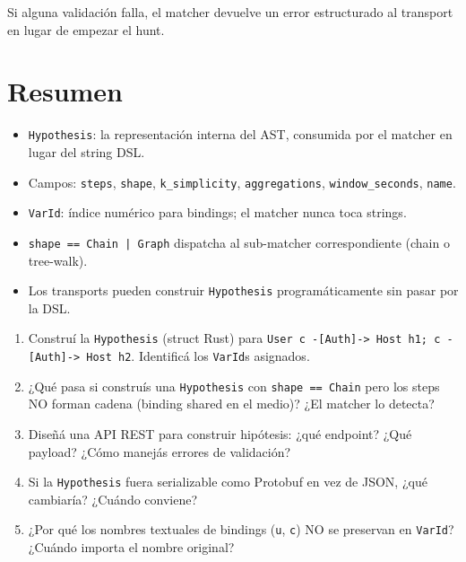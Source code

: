 \noindent
Si alguna validación falla, el matcher devuelve un error
estructurado al transport en lugar de empezar el hunt.

\section{Resumen}

\begin{itemize}
    \item \texttt{Hypothesis}: la representación interna del AST,
    consumida por el matcher en lugar del string DSL.
    \item Campos: \texttt{steps}, \texttt{shape}, \texttt{k\_simplicity},
    \texttt{aggregations}, \texttt{window\_seconds}, \texttt{name}.
    \item \texttt{VarId}: índice numérico para bindings; el matcher
    nunca toca strings.
    \item \texttt{shape == Chain | Graph} dispatcha al
    sub-matcher correspondiente (chain o tree-walk).
    \item Los transports pueden construir \texttt{Hypothesis}
    programáticamente sin pasar por la DSL.
\end{itemize}

\begin{ejercicios}
\begin{enumerate}
    \item \starred{} Construí la \texttt{Hypothesis} (struct Rust)
    para
    \texttt{User c -[Auth]-> Host h1; c -[Auth]-> Host h2}.
    Identificá los \texttt{VarId}s asignados.

    \item ¿Qué pasa si construís una \texttt{Hypothesis} con
    \texttt{shape == Chain} pero los steps NO forman cadena
    (binding shared en el medio)? ¿El matcher lo detecta?

    \item \starred{} Diseñá una API REST para construir
    hipótesis: ¿qué endpoint? ¿Qué payload? ¿Cómo manejás errores
    de validación?

    \item Si la \texttt{Hypothesis} fuera serializable como
    Protobuf en vez de JSON, ¿qué cambiaría? ¿Cuándo conviene?

    \item ¿Por qué los nombres textuales de bindings (\texttt{u},
    \texttt{c}) NO se preservan en \texttt{VarId}? ¿Cuándo importa
    el nombre original?
\end{enumerate}
\end{ejercicios}
